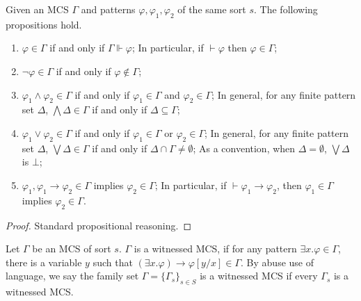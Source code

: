 \documentclass[acmsmall]{acmart}
\theoremstyle{acmdefinition}
\newcommand{\imp}{\to}
\begin{document}
\begin{proposition}
\label{prop_properties_of_MCS}
Given an MCS $\Gamma$
and patterns $\varphi, \varphi_1, \varphi_2$ of the same sort $s$.
The following propositions hold.
\begin{enumerate}
\item $\varphi \in \Gamma$ if and only if $\Gamma \Vdash \varphi$;
      In particular, if $\vdash \varphi$ then $\varphi \in \Gamma$;
\item $\neg \varphi \in \Gamma$ if and only if $\varphi \not\in \Gamma$;
\item $\varphi_1 \wedge \varphi_2 \in \Gamma$
      if and only if $\varphi_1 \in \Gamma$ and $\varphi_2 \in \Gamma$;
      In general, for any finite pattern set $\Delta$,
      $\bigwedge \Delta \in \Gamma$ if and only if
      $\Delta \subseteq \Gamma$;
\item $\varphi_1 \vee \varphi_2 \in \Gamma$
      if and only if $\varphi_1 \in \Gamma$ or $\varphi_2 \in \Gamma$;
      In general, for any finite pattern set $\Delta$,
      $\bigvee \Delta \in \Gamma$ if and only if
      $\Delta \cap \Gamma \neq \emptyset$;
      As a convention,
      when $\Delta = \emptyset$,
      $\bigvee \Delta$ is $\bot$;
\item $\varphi_1, \varphi_1 \imp \varphi_2 \in \Gamma$ implies
      $\varphi_2 \in \Gamma$;
      In particular, if $\vdash \varphi_1 \imp \varphi_2$,
      then $\varphi_1 \in \Gamma$ implies $\varphi_2 \in \Gamma$.
\end{enumerate}
\end{proposition}
\begin{proof}
Standard propositional reasoning.
\end{proof}

\begin{definition}
Let $\Gamma$ be an MCS of sort $s$.
$\Gamma$ is a witnessed MCS,
if for any pattern $\exists x . \varphi \in \Gamma$, 
there is a variable $y$ such that
$(\exists x . \varphi) \imp \varphi[y/x] \in \Gamma$.
By abuse use of language, 
we say the family set $\Gamma = \{ \Gamma_s \}_{s \in S}$ is a witnessed MCS
if every $\Gamma_s$ is a witnessed MCS.
\end{definition}
\end{document}
